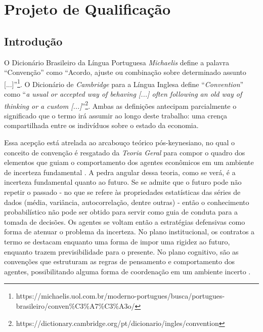 \chapter{Projeto de Qualificação} \label{projeto}

\section{Introdução}


O Dicionário Brasileiro da Língua Portuguesa \textit{Michaelis} define a palavra \enquote{Convenção} como \enquote{Acordo, ajuste ou combinação sobre determinado assunto [...]}\footnote{https://michaelis.uol.com.br/moderno-portugues/busca/portugues-brasileiro/conven\%C3\%A7\%C3\%A3o/}. O Dicionário de \textit{Cambridge} para a Língua Inglesa define \enquote{\textit{Convention}} como \enquote{\textit{a usual or accepted way of behaving [...] often following an old way of thinking or a custom [...]}}\footnote{https://dictionary.cambridge.org/pt/dicionario/ingles/convention}. Ambas as definições antecipam parcialmente o significado que o termo irá assumir ao longo deste trabalho: uma crença compartilhada entre os indivíduos sobre o estado da economia. 

Essa acepção está atrelada ao arcabouço teórico pós-keynesiano, no qual o conceito de convenção é resgatado da \textit{Teoria Geral} para compor o quadro dos elementos que guiam o comportamento dos agentes econômicos em um ambiente de incerteza fundamental \textcite{carvalho_keynes_2020}. A pedra angular dessa teoria, como se verá, é a incerteza fundamental quanto ao futuro. Se se admite que o futuro pode não repetir o passado - no que se refere às propriedades estatísticas das séries de dados (média, variância, autocorrelação, dentre outras) - então o conhecimento probabilístico não pode ser obtido para servir como guia de conduta para a tomada de decisões. Os agentes se voltam então a estratégias defensivas como forma de atenuar o problema da incerteza. No plano institucional, os contratos a termo se destacam enquanto uma forma de impor uma rigidez ao futuro, enquanto trazem previsibilidade para o presente. No plano cognitivo, são as convenções que estruturam as regras de pensamento e comportamento dos agentes, possibilitando alguma forma de coordenação em um ambiente incerto \parencite{abramo_cidade_2007, erber_as_2011, carvalho_keynes_2020, dequech_conventions_2022}.



